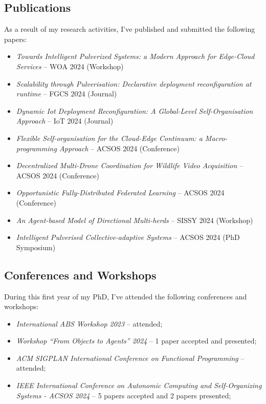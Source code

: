 \documentclass[runningheads]{llncs}
\begin{document}
\subsection{Publications}

As a result of my research activities,
I've published and submitted the following papers:

\begin{itemize}
    \item \emph{Towards Intelligent Pulverized Systems: a Modern Approach for Edge-Cloud Services} -- WOA 2024 (Workshop)
    \item \emph{Scalability through Pulverisation: Declarative deployment reconfiguration at runtime} -- FGCS 2024 (Journal)
    \item \emph{Dynamic Iot Deployment Reconfiguration: A Global-Level Self-Organisation Approach} -- IoT 2024 (Journal)
    \item \emph{Flexible Self-organisation for the Cloud-Edge Continuum: a Macro-programming Approach} -- ACSOS 2024 (Conference)
    \item \emph{Decentralized Multi-Drone Coordination for Wildlife Video Acquisition} -- ACSOS 2024 (Conference)
    \item \emph{Opportunistic Fully-Distributed Federated Learning} -- ACSOS 2024 (Conference)
    \item \emph{An Agent-based Model of Directional Multi-herds} -- SISSY 2024 (Workshop)
    \item \emph{Intelligent Pulverised Collective-adaptive Systems} -- ACSOS 2024 (PhD Symposium)
\end{itemize}

\subsection{Conferences and Workshops}

During this first year of my PhD,
I've attended the following conferences and workshops:

\begin{itemize}
    \item \emph{International ABS Workshop 2023} -- attended;
    \item \emph{Workshop ``From Objects to Agents'' 2024} -- 1 paper accepted and presented;
    \item \emph{ACM SIGPLAN International Conference on Functional Programming} -- attended;
    \item \emph{IEEE International Conference on Autonomic Computing and Self-Organizing Systems - ACSOS 2024} -- 5 papers accepted and 2 papers presented;
\end{itemize}
\end{document}
